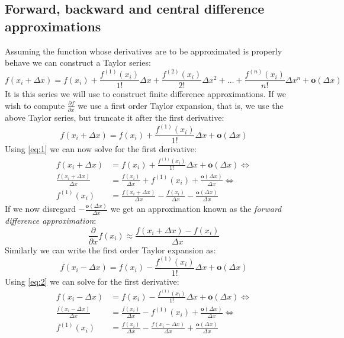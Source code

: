 \subsection{Forward, backward and central difference approximations}
Assuming the function whose derivatives are to be approximated is properly behave we can construct a Taylor series:
\begin{equation*}
	f(x_i + \Delta x) = f(x_i) + \frac{f^{(1)}(x_i)}{1!}\Delta x + \frac{f^{(2)}(x_i)}{2!}\Delta x^2 + \dots + \frac{f^{(n)}(x_i)}{n!}\Delta x^n + \mathbf{o}(\Delta x)
\end{equation*}
It is this series we will use to construct finite difference approximations. If we wish to compute $\frac{\partial f}{\partial x}$ we use a first order Taylor expansion, that is, we use the above Taylor series, but truncate it after the first derivative:
\begin{equation}
	f(x_i + \Delta x) = f(x_i) + \frac{f^{(1)}(x_i)}{1!}\Delta x + \mathbf{o}(\Delta x) \label{eq:1}
\end{equation}
Using \autoref{eq:1} we can now solve for the first derivative:
\begin{align*}
	f(x_i + \Delta x) &= f(x_i) + \frac{f^{(1)}(x_i)}{1!}\Delta x + \mathbf{o}(\Delta x) \iff\\
	\frac{f(x_i + \Delta x)}{\Delta x} &= \frac{f(x_i)}{\Delta x} + f^{(1)}(x_i) + \frac{\mathbf{o}(\Delta x)}{\Delta x} \iff\\
	f^{(1)}(x_i) &= \frac{f(x_i + \Delta x)}{\Delta x} - \frac{f(x_i)}{\Delta x} - \frac{\mathbf{o}(\Delta x)}{\Delta x} 
\end{align*}
If we now disregard $- \frac{\mathbf{o}(\Delta x)}{\Delta x}$ we get an approximation known as the \textit{forward difference approximation}:
\begin{equation*}
	\frac{\partial}{\partial x}f(x_i) \approx \frac{f(x_i + \Delta x) - f(x_i)}{\Delta x}
\end{equation*}
Similarly we can write the first order Taylor expansion as:
\begin{equation}
	f(x_i - \Delta x) = f(x_i) - \frac{f^{(1)}(x_i)}{1!}\Delta x + \mathbf{o}(\Delta x) \label{eq:2}
\end{equation}
Using \autoref{eq:2} we can solve for the first derivative:
\begin{align*}
	f(x_i - \Delta x) &= f(x_i) - \frac{f^{(1)}(x_i)}{1!}\Delta x + \mathbf{o}(\Delta x) \iff\\
	\frac{f(x_i - \Delta x)}{\Delta x} &= \frac{f(x_i)}{\Delta x} - f^{(1)}(x_i) + \frac{\mathbf{o}(\Delta x)}{\Delta x} \iff\\
	f^{(1)}(x_i) &= \frac{f(x_i)}{\Delta x} - \frac{f(x_i - \Delta x)}{\Delta x} + \frac{\mathbf{o}(\Delta x)}{\Delta x} 
\end{align*}
